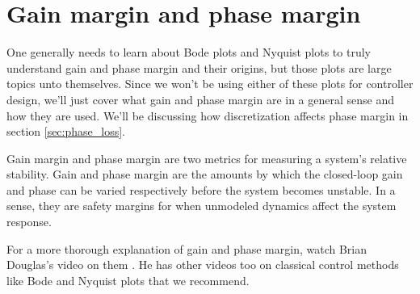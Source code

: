 \section{Gain margin and phase margin}
\label{sec:gain_phase_margin}

One generally needs to learn about Bode plots and Nyquist plots to truly
understand gain and phase margin and their origins, but those plots are large
topics unto themselves. Since we won't be using either of these plots for
controller design, we'll just cover what gain and phase margin are in a general
sense and how they are used. We'll be discussing how \gls{discretization}
affects phase margin in section \ref{sec:phase_loss}.

Gain margin and phase margin are two metrics for measuring a \gls{system}'s
relative stability. Gain and phase margin are the amounts by which the
closed-loop gain and phase can be varied respectively before the \gls{system}
becomes unstable. In a sense, they are safety margins for when unmodeled
dynamics affect the \gls{system response}.

For a more thorough explanation of gain and phase margin, watch Brian Douglas's
video on them \cite{bib:gain_phase_margin}. He has other videos too on classical
control methods like Bode and Nyquist plots that we recommend.
